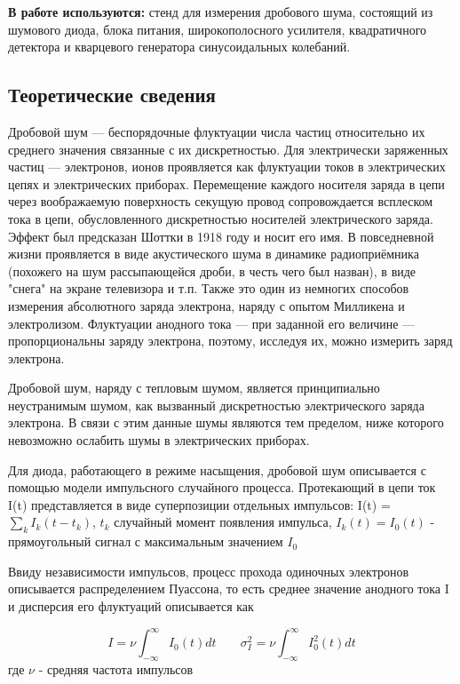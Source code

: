\documentclass[12pt,a4paper]{article}
\begin{document}
\textbf{В работе используются: } стенд для измерения дробового шума, состоящий из шумового диода, блока питания, широкополосного усилителя, квадратичного детектора и кварцевого генератора синусоидальных колебаний.


\subsection{Теоретические сведения}

\par Дробовой шум — беспорядочные флуктуации числа частиц относительно их среднего значения связанные с их дискретностью. Для электрически заряженных частиц — электронов, ионов проявляется как флуктуации токов в электрических цепях и электрических приборах. Перемещение каждого носителя заряда в цепи через воображаемую поверхность секущую провод сопровождается всплеском тока в цепи, обусловленного дискретностью носителей электрического заряда. Эффект был предсказан Шоттки в 1918 году и носит его имя. В повседневной жизни проявляется в виде акустического шума в динамике радиоприёмника (похожего на шум рассыпающейся дроби, в честь чего был назван), в виде "снега" на экране телевизора и т.п. Также это один из немногих способов измерения абсолютного заряда электрона, наряду с опытом Милликена и электролизом. Флуктуации анодного тока — при заданной его величине — пропорциональны заряду электрона, поэтому, исследуя их, можно измерить заряд электрона. 

\par Дробовой шум, наряду с тепловым шумом, является принципиально неустранимым шумом, как вызванный дискретностью электрического заряда электрона. В связи с этим данные шумы являются тем пределом, ниже которого невозможно ослабить шумы в электрических приборах.

\par Для диода, работающего в режиме насыщения, дробовой шум описывается с помощью модели импульсного случайного процесса. Протекающий в цепи ток I(t) представляется в виде суперпозиции отдельных импульсов: I(t) = $\sum_k I_k(t - t_k)$, $t_k$ случайный момент появления импульса, $I_k(t) = I_0(t)$ - прямоугольный сигнал с максимальным значением $I_0$

\par Ввиду независимости импульсов, процесс прохода одиночных электронов описывается распределением Пуассона, то есть среднее значение анодного тока I и дисперсия его флуктуаций описывается как 

\begin{equation}
I = \nu\int_{-\infty}^{\infty}{I_0(t)dt} \;\;\;\;\;\;\; \sigma_I^2 = \nu\int_{-\infty}^{\infty}{I_0^2(t)dt}
\end{equation}
где $\nu$ - средняя частота импульсов
\end{document}
